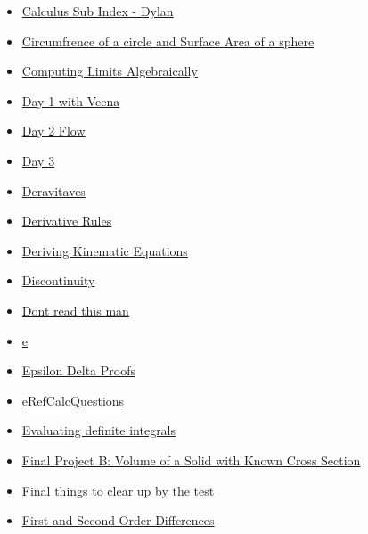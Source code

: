\documentclass[11pt]{article}
\begin{document}
\begin{itemize}
\begin{itemize}
\begin{itemize}
\item \href{mathematics/single\_variable\_calculus/KBd2020math401SubIndex.org}{Calculus Sub Index - Dylan}
\item \href{mathematics/single\_variable\_calculus/KBe21math401retSurfaceAreaOfSphere.org}{Circumfrence of a circle and Surface Area of a sphere}
\item \href{mathematics/single\_variable\_calculus/KBMATH401ComputingLimits.org}{Computing Limits Algebraically}
\item \href{mathematics/single\_variable\_calculus/KBhMATH401Day1.org}{Day 1 with Veena}
\item \href{mathematics/single\_variable\_calculus/KBe2020math401flo2.org}{Day 2 Flow}
\item \href{mathematics/single\_variable\_calculus/eFloCalcD3.org}{Day 3}
\item \href{mathematics/single\_variable\_calculus/KBhMATH401Derivatives.org}{Deravitaves}
\item \href{mathematics/single\_variable\_calculus/KBrefDerivativeRules.org}{Derivative Rules}
\item \href{mathematics/single\_variable\_calculus/KBrefDerivingKinematicEquations.org}{Deriving Kinematic Equations}
\item \href{mathematics/single\_variable\_calculus/KBhMATH401Discontinuity.org}{Discontinuity}
\item \href{mathematics/single\_variable\_calculus/KBtestreflectionquestionhuxley.org}{Dont read this man}
\item \href{mathematics/single\_variable\_calculus/KbhMATH401e.org}{e}
\item \href{mathematics/single\_variable\_calculus/KbhMATH401EpsilonDeltaProofs.org}{Epsilon Delta Proofs}
\item \href{mathematics/single\_variable\_calculus/eRefCalcQuestions.org}{eRefCalcQuestions}
\item \href{mathematics/single\_variable\_calculus/KBe21math401retHandout24EvaluatingDefiniteIntegrals.org}{Evaluating definite integrals}
\item \href{mathematics/single\_variable\_calculus/KBe21math401retCrossSectionSolidExample.org}{Final Project B: Volume of a Solid with Known Cross Section}
\item \href{mathematics/single\_variable\_calculus/KBhMATH401APCalc.org}{Final things to clear up by the test}
\item \href{mathematics/single\_variable\_calculus/KBhMATH401FirstAndSecondOrder.org}{First and Second Order Differences}

\end{itemize}
\end{itemize}
\end{itemize}
\end{document}

